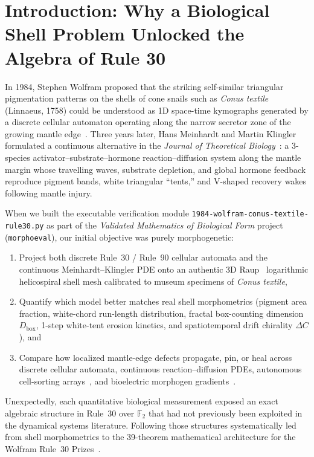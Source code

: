 \documentclass[11pt,a4paper]{article}
\theoremstyle{definition}
\theoremstyle{remark}
\newcommand{\Ftwo}{\mathbb{F}_2}
\begin{document}
\tableofcontents

\section{Introduction: Why a Biological Shell Problem Unlocked the Algebra of Rule 30}

In 1984, Stephen Wolfram proposed that the striking self-similar triangular pigmentation patterns on the shells of cone snails such as \emph{Conus textile} (Linnaeus, 1758) could be understood as 1D space-time kymographs generated by a discrete cellular automaton operating along the narrow secretor zone of the growing mantle edge~\cite{Wolfram1984,Wolfram2002}. Three years later, Hans Meinhardt and Martin Klingler formulated a continuous alternative in the \emph{Journal of Theoretical Biology}~\cite{MeinhardtKlingler1987,Meinhardt2009}: a 3-species activator--substrate--hormone reaction--diffusion system along the mantle margin whose travelling waves, substrate depletion, and global hormone feedback reproduce pigment bands, white triangular ``tents,'' and V-shaped recovery wakes following mantle injury.

When we built the executable verification module \texttt{1984-wolfram-conus-textile-rule30.py} as part of the \emph{Validated Mathematics of Biological Form} project (\texttt{morphoeval}), our initial objective was purely morphogenetic:
\begin{enumerate}
  \item Project both discrete Rule~30 / Rule~90 cellular automata and the continuous Meinhardt--Klingler PDE onto an authentic 3D Raup~\cite{Raup1966} logarithmic helicospiral shell mesh calibrated to museum specimens of \emph{Conus textile},
  \item Quantify which model better matches real shell morphometrics (pigment area fraction, white-chord run-length distribution, fractal box-counting dimension $D_{\mathrm{box}}$, 1-step white-tent erosion kinetics, and spatiotemporal drift chirality $\Delta C$), and
  \item Compare how localized mantle-edge defects propagate, pin, or heal across discrete cellular automata, continuous reaction--diffusion PDEs, autonomous cell-sorting arrays~\cite{ZhangGoldsteinLevin2025}, and bioelectric morphogen gradients~\cite{CerveraLevinMafe2021}.
\end{enumerate}

Unexpectedly, each quantitative biological measurement exposed an exact algebraic structure in Rule~30 over $\Ftwo$ that had not previously been exploited in the dynamical systems literature. Following those structures systematically led from shell morphometrics to the 39-theorem mathematical architecture for the Wolfram Rule~30 Prizes~\cite{Wolfram2019}.
\end{document}
